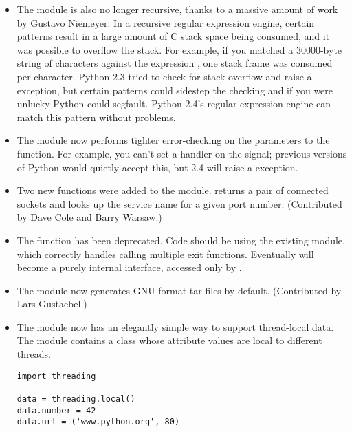 \documentclass{howto}
\begin{document}
\begin{itemize}
\item The  module is also no longer recursive, thanks to a
massive amount of work by Gustavo Niemeyer.  In a recursive regular
expression engine, certain patterns result in a large amount of C
stack space being consumed, and it was possible to overflow the stack.
For example, if you matched a 30000-byte string of  characters
against the expression , one stack frame was consumed
per character.  Python 2.3 tried to check for stack overflow and raise
a  exception, but certain patterns could
sidestep the checking and if you were unlucky Python could segfault.
Python 2.4's regular expression engine can match this pattern without
problems.

\item The  module now performs tighter error-checking
on the parameters to the  function.  For
example, you can't set a handler on the  signal;
previous versions of Python would quietly accept this, but 2.4 will
raise a  exception.

\item Two new functions were added to the  module.
 returns a pair of connected sockets and
 looks up the service name for a
given port number. (Contributed by Dave Cole and Barry Warsaw.)

\item The  function has been deprecated.  Code
should be using the existing  module, which correctly
handles calling multiple exit functions.  Eventually
 will become a purely internal interface,
accessed only by .

\item The  module now generates GNU-format tar files
by default.  (Contributed by Lars Gustaebel.)

\item The  module now has an elegantly simple way to support 
thread-local data.  The module contains a  class whose
attribute values are local to different threads.

\begin{verbatim}
import threading

data = threading.local()
data.number = 42
data.url = ('www.python.org', 80)
\end{verbatim}


\end{itemize}
\end{document}
